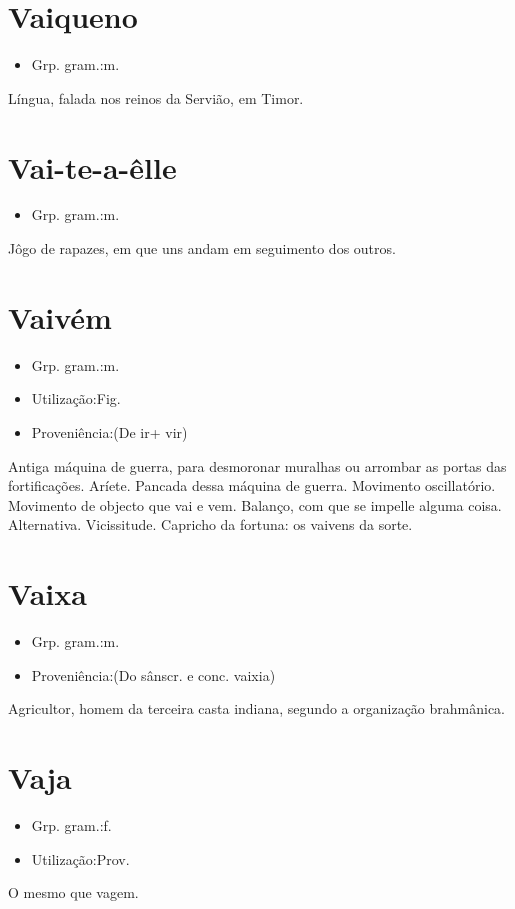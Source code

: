 \documentclass{article}
\begin{document}
\section{Vaiqueno}
\begin{itemize}
\item {Grp. gram.:m.}
\end{itemize}
Língua, falada nos reinos da Servião, em Timor.
\section{Vai-te-a-êlle}
\begin{itemize}
\item {Grp. gram.:m.}
\end{itemize}
Jôgo de rapazes, em que uns andam em seguimento dos outros.
\section{Vaivém}
\begin{itemize}
\item {Grp. gram.:m.}
\end{itemize}
\begin{itemize}
\item {Utilização:Fig.}
\end{itemize}
\begin{itemize}
\item {Proveniência:(De \textunderscore ir\textunderscore  + \textunderscore vir\textunderscore )}
\end{itemize}
Antiga máquina de guerra, para desmoronar muralhas ou arrombar as portas das fortificações.
Aríete.
Pancada dessa máquina de guerra.
Movimento oscillatório.
Movimento de objecto que vai e vem.
Balanço, com que se impelle alguma coisa.
Alternativa.
Vicissitude.
Capricho da fortuna: \textunderscore os vaivens da sorte\textunderscore .
\section{Vaixa}
\begin{itemize}
\item {Grp. gram.:m.}
\end{itemize}
\begin{itemize}
\item {Proveniência:(Do sânscr. e conc. \textunderscore vaixia\textunderscore )}
\end{itemize}
Agricultor, homem da terceira casta indiana, segundo a organização brahmânica.
\section{Vaja}
\begin{itemize}
\item {Grp. gram.:f.}
\end{itemize}
\begin{itemize}
\item {Utilização:Prov.}
\end{itemize}
O mesmo que \textunderscore vagem\textunderscore .
\end{document}
